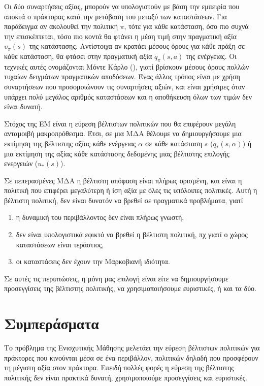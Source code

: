 Οι δύο συναρτήσεις αξίας, μπορούν να υπολογιστούν με βάση την εμπειρία που αποκτά ο πράκτορας κατά την μετάβαση του μεταξύ των καταστάσεων.
Για παράδειγμα αν ακολουθεί την πολιτική $π$, τότε για κάθε κατάσταση, όσο πιο συχνά την επισκέπτεται, τόσο πιο κοντά θα φτάνει η μέση τιμή
στην πραγματική αξία $υ_π(s)$ της κατάστασης. Αντίστοιχα αν κρατάει μέσους όρους για κάθε πράξη σε κάθε κατάσταση, θα φτάσει στην πραγματική
αξία $q_π(s,a)$ της ενέργειας. Οι τεχνικές αυτές ονομάζονται Μόντε Κάρλο (), γιατί βρίσκουν μέσους όρους πολλών τυχαίων δειγμάτων πραγματικών αποδόσεων.
Ένας άλλος τρόπος είναι με χρήση συναρτήσεων που προσομοιώνουν τις συναρτήσεις αξιών, και είναι χρήσιμες όταν υπάρχει πολύ μεγάλος αριθμός καταστάσεων
και η αποθήκευση όλων των τιμών δεν είναι δυνατή.

Στόχος της ΕΜ είναι η εύρεση βέλτιστων πολιτικών που θα επιφέρουν μεγάλη ανταμοιβή μακροπρόθεσμα. Έτσι, σε μια ΜΔΑ θέλουμε να δημιουργήσουμε
μια εκτίμηση της βέλτιστης αξίας κάθε ενέργειας $α$ σε κάθε κατάσταση $s$ ($q_*(s,α)$) ή μια εκτίμηση της αξίας κάθε κατάστασης δεδομένης
μιας βέλτιστης επιλογής ενεργειών ($u_*(s)$).

Σε πεπερασμένες ΜΔΑ η βέλτιστη απόφαση είναι πλήρως ορισμένη, και είναι η πολιτική που επιφέρει μεγαλύτερη ή ίση αξία με όλες τις υπόλοιπες πολιτικές.
Αυτή η βέλτιστη πολιτική, δεν είναι δυνατόν να βρεθεί σε πραγματικά προβλήματα, γιατί
\begin{enumerate}
    \item η δυναμική του περιβάλλοντος δεν είναι πλήρως γνωστή,
    \item δεν είναι υπολογιστικά εφικτό να βρεθεί η βέλτιστη πολιτική, πχ γιατί ο χώρος καταστάσεων είναι τεράστιος,
    \item οι καταστάσεις δεν έχουν την Μαρκοβιανή ιδιότητα.
\end{enumerate}

Σε αυτές τις περιπτώσεις, η μόνη μας επιλογή είναι είτε να δημιουργήσουμε προσεγγίσεις της βέλτιστης πολιτικής, να χρησιμοποιήσουμε ευριστικές, ή και τα δύο.

\section{Συμπεράσματα}

Το πρόβλημα της Ενισχυτικής Μάθησης μελετάει την εύρεση βέλτιστων πολιτικών για πράκτορες που κινούνται μέσα σε ένα περιβάλλον,
πολιτικών δηλαδή που προσφέρουν τη μέγιστη αξία στον πράκτορα. Επειδή πολλές φορές η εύρεση της βέλτιστης πολιτικής δεν είναι πρακτικά δυνατή,
χρησιμοποιούμε προσεγγίσεις και ευριστικές.

